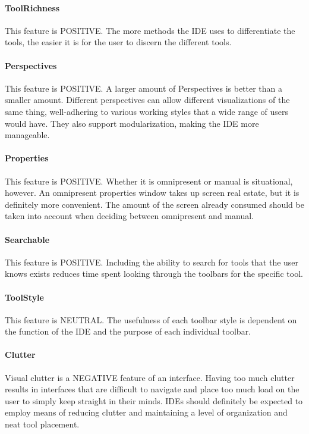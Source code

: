 \paragraph{ToolRichness} This feature is POSITIVE. The more methods the IDE
uses to differentiate the tools, the easier it is for the user to discern
the different tools.

\paragraph{Perspectives} This feature is POSITIVE. A larger amount of
Perspectives is better than a smaller amount. Different perspectives can
allow different visualizations of the same thing, well-adhering to various
working styles that a wide range of users would have. They also support
modularization, making the IDE more manageable.

\paragraph{Properties} This feature is POSITIVE. Whether it is omnipresent
or manual is situational, however. An omnipresent properties window takes
up screen real estate, but it is definitely more convenient. The amount of
the screen already consumed should be taken into account when deciding
between omnipresent and manual.

\paragraph{Searchable} This feature is POSITIVE. Including the ability to
search for tools that the user knows exists reduces time spent looking
through the toolbars for the specific tool.

\paragraph{ToolStyle} This feature is NEUTRAL. The usefulness of each
toolbar style is dependent on the function of the IDE and the purpose of
each individual toolbar.

\paragraph{Clutter} Visual clutter is a NEGATIVE feature of an interface.
Having too much clutter results in interfaces that are difficult to
navigate and place too much load on the user to simply keep straight in
their minds. IDEs should definitely be expected to employ means of reducing
clutter and maintaining a level of organization and neat tool placement.


